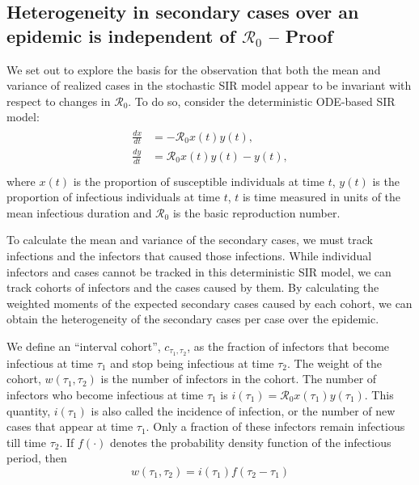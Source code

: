 

\subsection{Heterogeneity in secondary cases over an epidemic is independent of $\mathcal{R}_0$ -- Proof}
We set out to explore the basis for the observation that both the mean and variance of realized cases in the stochastic SIR model appear to be invariant with respect to changes in $\mathcal{R}_0$. To do so, consider the deterministic ODE-based SIR model:
\begin{align}
    \begin{split}
        \frac{dx}{dt} &= - \mathcal{R}_0 x(t)y(t), \\
        \frac{dy}{dt} &= \mathcal{R}_0 x(t)y(t) - y(t), \\
    \end{split}
\end{align}
where $x(t)$ is the proportion of susceptible individuals at time $t$, $y(t)$ is the proportion of infectious individuals at time $t$, $t$ is time measured in units of the mean infectious duration and $\mathcal{R}_0$ is the basic reproduction number.

To calculate the mean and variance of the secondary cases, we must track infections and the infectors that caused those infections. While individual infectors and cases cannot be tracked in this deterministic SIR model, we can track cohorts of infectors and the cases caused by them. By calculating the weighted moments of the expected secondary cases caused by each cohort, we can obtain the heterogeneity of the secondary cases per case over the epidemic. 

We define an “interval cohort”, $c_{\tau_1,\tau_2}$, as the fraction of infectors that become infectious at time $\tau_1$ and stop being infectious at time $\tau_2$. The weight of the cohort, $w(\tau_1,\tau_2)$ is the number of infectors in the cohort. The number of infectors who become infectious at time $\tau_1$ is $i(\tau_1) = \mathcal{R}_0 x(\tau_1)y(\tau_1)$. This quantity, $i(\tau_1)$ is also called the incidence of infection, or the number of new cases that appear at time $\tau_1$. Only a fraction of these infectors remain infectious till time $\tau_2$. If $f(\cdot)$ denotes the probability density function of the infectious period, then
\begin{equation}
    w(\tau_1,\tau_2) = i(\tau_1)f(\tau_2-\tau_1)
\end{equation}

